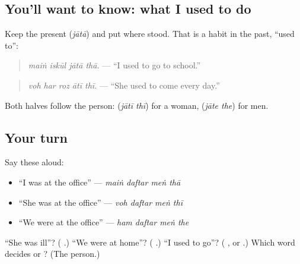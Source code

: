 \subsection*{You'll want to know: what I used to do}
Keep the present \textbf{} (\emph{jātā}) and put \textbf{} where \textbf{} stood. That is a habit in the past, \textquotedblleft{}used to\textquotedblright{}:

\begin{quote}
\textbf{   }
\end{quote}

\begin{quote}
\emph{maiṅ iskūl jātā thā.} — \textquotedblleft{}I used to go to school.\textquotedblright{}
\end{quote}

\begin{quote}
\textbf{    }
\end{quote}

\begin{quote}
\emph{voh har roz ātī thī.} — \textquotedblleft{}She used to come every day.\textquotedblright{}
\end{quote}

Both halves follow the person: \textbf{ } (\emph{jātī thī}) for a woman, \textbf{ } (\emph{jāte the}) for men.

\subsection*{Your turn}
Say these aloud:

\begin{itemize}
\raggedright
  \item \textquotedblleft{}I was at the office\textquotedblright{} — \emph{maiṅ daftar meṅ thā}
  \item \textquotedblleft{}She was at the office\textquotedblright{} — \emph{voh daftar meṅ thī}
  \item \textquotedblleft{}We were at the office\textquotedblright{} — \emph{ham daftar meṅ the}
\end{itemize}

\begin{tcolorbox}[breakable,colback=teal!4,colframe=teal!35!black,title={Before you move on}]
\textquotedblleft{}She was ill\textquotedblright{}? (\textbf{  }.) \textquotedblleft{}We were at home\textquotedblright{}? (\textbf{   }.) \textquotedblleft{}I used to go\textquotedblright{}? (\textbf{  }, or \textbf{ }.) Which word decides \textbf{} or \textbf{}? (The person.)
\end{tcolorbox}

